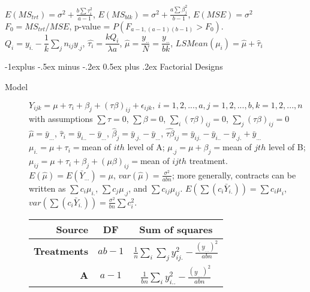 \documentclass[10pt,landscape]{article}
\makeatletter
\renewcommand{\subsection}{\@startsection{subsection}{2}{0mm}%
                                {-1explus -.5ex minus -.2ex}%
                                {0.5ex plus .2ex}%
                                {\normalfont\normalsize\bfseries}}
\makeatother
\begin{document}
\begin{multicols}{3}
\begin{description}
\begin{center}
\begin{tabular}{r|cc}
            \end{tabular}
        \end{center}
        $E(MS_{trt}) = \sigma^2 + \frac{b\sum \tau_i^2}{a-1}$, $E(MS_{blk}) = \sigma^2 + \frac{a \sum \beta_j^2}{b-1}$, $E(MSE) = \sigma^2$\\
        $F_0 = MS_{trt}/MSE$, p-value = $P(F_{a-1, (a-1)(b-1)} > F_0)$.\\
        $Q_i = y_{i.} - \dfrac{1}{k} \sum_j n_{ij}y_{.j}$, $\hat{\tau_i} = \dfrac{kQ_i}{\lambda a}$, $\hat{\mu} = \dfrac{y_{..}}{N} = \dfrac{y_{..}}{bk}$, $LSMean(\mu_i) = \hat{\mu} + \hat{\tau}_i$
	\end{description}
	
	
\subsection{Factorial Designs}
	\begin{description}
	\item[Model] $Y_{ijk} = \mu + \tau_i + \beta_j + (\tau \beta)_{ij} + \epsilon_{ijk}, \ i = 1,2,...,a, j = 1,2,..., b, k = 1,2, ..., n$ with assumptions $\sum \tau = 0$, $\sum	\beta = 0$, $\sum_i (\tau \beta)_{ij}  = 0$, $\sum_j (\tau \beta)_{ij}  = 0$ \\ 
	$\hat{\mu} = \bar{y}_{...}$, $\hat{\tau}_i = \bar{y}_{i..} - \bar{y}_{...}$, $\hat{\beta}_j = \bar{y}_{.j.} - \bar{y}_{...}$, $\hat{\tau \beta}_{ij} = \bar{y}_{ij.} - \bar{y}_{i..} - \bar{y}_{.j.} + \bar{y}_{...}$\\
	$\mu_{i.} = \mu + \tau_i = $mean of $ith$ level of A; $\mu_{.j} = \mu + \beta_j = $mean of $jth$ level of B; $\mu_{ij} = \mu + \tau_i + \beta_j + (\mu \beta)_{ij}= $mean of $ijth$ treatment. \\ 
	$E(\hat{\mu}) = E(\bar{Y}_{...}) = \mu$, $var(\hat{\mu}) = \frac{\sigma^2}{abn}$; more generally, contracts can be written as  $\sum c_i \mu_{i.}$, $\sum c_j \mu_{.j}$, and $\sum c_{ij} \mu_{ij}$. $E(\sum	(c_i \bar{Y}_{i.})) = \sum c_i \mu_i$, $var(\sum(c_i \bar{Y}_{i.})) = \frac{\sigma^2}{bn} \sum c_i^2$.\\ 
		   \begin{center}
            \begin{tabular}{r|cc}
                \textbf{Source}  & \textbf{DF} & \textbf{Sum of squares}  \\ 
                \hline
                \textbf{Treatments} & $ab-1$ & $\frac{1}{n} \sum_i \sum_j y_{ij.}^2 - \frac{(y_{...})^2}{abn}$ \\
                \textbf{A} & $a-1$ & $\frac{1}{bn} \sum_i y_{i..}^2 - \frac{(y_{...})^2}{abn}$ \\

\end{tabular}
\end{center}
\end{description}
\end{multicols}
\end{document}
